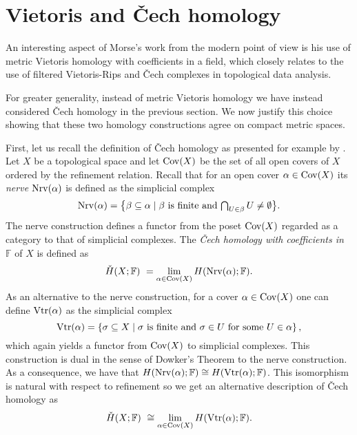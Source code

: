 
\section{Vietoris and \v{C}ech homology} \label{s:vietoris}

An interesting aspect of Morse's work from the modern point of view is his use of metric Vietoris homology with coefficients in a field, which closely relates to the use of filtered Vietoris-Rips and \v{C}ech complexes in topological data analysis.

For greater generality, instead of metric Vietoris homology we have instead considered \v{C}ech homology in the previous section.
We now justify this choice showing that these two homology constructions agree on compact metric spaces.

First, let us recall the definition of \v{C}ech homology as presented for example by \citet[Section IX--X]{MR0050886}.
Let $X$ be a topological space and let $\operatorname{Cov}(X)$ be the set of all open covers of $X$ ordered by the refinement relation. 
Recall that for an open cover $\alpha \in \operatorname{Cov}(X)$ its \emph{nerve} $\operatorname{Nrv}(\alpha)$ is defined as the simplicial complex
\begin{equation*}
\operatorname{Nrv}(\alpha) =
\big\{ \beta \subseteq \alpha \mid \beta \text{ is finite and } \textstyle{\bigcap_{U \in \beta}} \, U \neq \emptyset \big\}.
\end{equation*}
The nerve construction defines a functor from the poset $\operatorname{Cov}(X)$ regarded as a category to that of simplicial complexes. 
The \emph{\v{C}ech homology with coefficients in $\mathbb{F}$} of $X$ is defined as
\begin{equation*}
\check{H}(X; \mathbb{F}) \ =
\lim_{\alpha \in \operatorname{Cov}(X)} H(\operatorname{Nrv}(\alpha); \mathbb{F}).
\end{equation*}
As an alternative to the nerve construction, for a cover $\alpha \in \operatorname{Cov}(X)$ one can define $\operatorname{Vtr}(\alpha)$ as the simplicial complex
\begin{equation*}
\operatorname{Vtr} (\alpha) = \left\{ \sigma \subseteq X \mid \sigma \text{ is finite and } \sigma \in U \text{ for some } U \in \alpha  \right\},
\end{equation*}
which again yields a functor from $\operatorname{Cov}(X)$ to simplicial complexes.
This construction is dual in the sense of Dowker's Theorem \cite{Dowker.1952} to the nerve construction.
As a consequence, we have that $H (\operatorname{Nrv} (\alpha); \mathbb{F}) \cong H (\operatorname{Vtr} (\alpha); \mathbb{F})$.
This isomorphism is natural with respect to refinement so we get an alternative description of \v{C}ech homology as 
\begin{equation*}
\check{H} (X; \mathbb{F}) \ \cong
\lim_{\alpha \in \operatorname{Cov} (X)} H (\operatorname{Vtr} (\alpha); \mathbb{F}).
\end{equation*}

